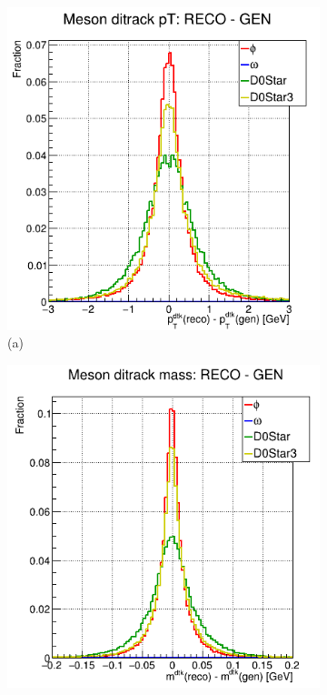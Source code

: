 \begin{myitemlist}
    \begin{figure}[!ht]
        \captionsetup[subfigure]{labelformat=empty}
        \vspace*{-0.2cm}
        \centering
        \setlength{\mylength}{\textwidth}
        \begin{subfigure}[t]{0.50\mylength}
                \centering
                \includegraphics[width=0.45\mylength]{resources/plots/ditrack_residuals_pt.png}
                \caption{\footnotesize (a)}
        \end{subfigure}%
        \begin{subfigure}[t]{0.50\mylength}
                \centering
                \includegraphics[width=0.45\mylength]{resources/plots/ditrack_residuals_mass.png}

\end{subfigure}
\end{figure}
\end{myitemlist}

